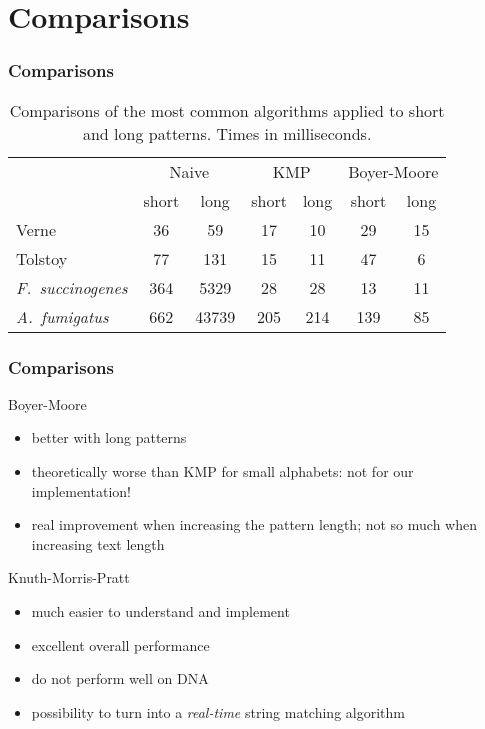 \documentclass{beamer}
\begin{document}
\section{Comparisons}
\label{sec:comparisons}


\begin{frame}
  \frametitle{Comparisons}

  \begin{table}[ht]
    \centering
    \begin{tabular}{lcccccc}
    \toprule[1.5pt]
    & \multicolumn{2}{c}{Naive} & \multicolumn{2}{c}{KMP} & \multicolumn {2}{c}{Boyer-Moore} \\
    & short & long & short & long & short & long \\
    \cmidrule(r){1-1} \cmidrule(lr){2-3} \cmidrule(lr){4-5} \cmidrule(l){6-7}
    Verne & 36 & 59 & 17 & 10 & 29 & 15 \\
    Tolstoy & 77 & 131 & 15 & 11 & 47 & 6 \\
    \emph{F.\ succinogenes} & 364 & 5329 & 28 & 28 & 13 & 11 \\
    \emph{A.\ fumigatus} & 662 & 43739 & 205 & 214 & 139 & 85 \\
    \bottomrule[1.5pt]
  \end{tabular}
  \caption{Comparisons of the most common algorithms applied to short and long patterns. Times in milliseconds.}
\end{table}
\end{frame}


\begin{frame}
  \frametitle{Comparisons}

  \begin{block}{Boyer-Moore}
    \begin{itemize}
    \item better with long patterns
    \item theoretically worse than KMP for small alphabets: not for
      our implementation!
    \item real improvement when increasing the pattern length; not so
      much when increasing text length
    \end{itemize}
  \end{block}

  \begin{block}{Knuth-Morris-Pratt}
    \begin{itemize}
    \item much easier to understand and implement
    \item excellent overall performance
    \item do not perform well on DNA
    \item possibility to turn into a \emph{real-time} string matching
      algorithm
    \end{itemize}
  \end{block}
\end{frame}
\end{document}
